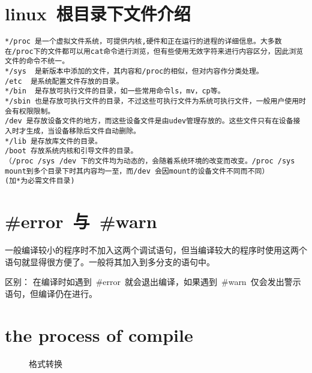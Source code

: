 \section{linux~根目录下文件介绍}
\begin{verbatim}
*/proc 是一个虚拟文件系统，可提供内核,硬件和正在运行的进程的详细信息。大多数在/proc下的文件都可以用cat命令进行浏览，但有些使用无效字符来进行内容区分，因此浏览文件的命令不统一。
*/sys  是新版本中添加的文件，其内容和/proc的相似，但对内容作分类处理。
/etc  是系统配置文件存放的目录。
*/bin  是存放可执行文件的目录，如一些常用命令ls，mv，cp等。
*/sbin 也是存放可执行文件的目录，不过这些可执行文件为系统可执行文件，一般用户使用时会有权限限制。
/dev 是存放设备文件的地方，而这些设备文件是由udev管理存放的。这些文件只有在设备接入时才生成，当设备移除后文件自动删除。
*/lib 是存放库文件的目录。 
/boot 存放系统内核和引导文件的目录。
（/proc /sys /dev 下的文件均为动态的，会随着系统环境的改变而改变。/proc /sys mount到多个目录下时其内容均一至，而/dev 会因mount的设备文件不同而不同）
(加*为必需文件目录)
\end{verbatim}

\section{\#error~与~\#warn}
一般编译较小的程序时不加入这两个调试语句，但当编译较大的程序时使用这两个语句就显得很方便了。一般将其加入到多分支的语句中。

区别：
在编译时如遇到~\#error~就会退出编译，如果遇到~\#warn~仅会发出警示语句，但编译仍在进行。

\section{the process of compile}

\begin{figure}[htbp]
\centering
{}
\caption{格式转换}
\label{fig:convert_format}
\end{figure}

